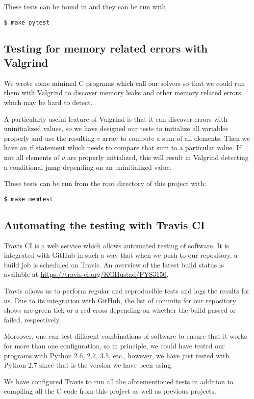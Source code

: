 These tests can be found in  and they can be run with

\begin{verbatim}
$ make pytest
\end{verbatim}


\subsection{Testing for memory related errors with Valgrind}
\label{appx:testing:valgrind}
We wrote some minimal C programs which call our solvers so that we could run them with Valgrind to discover memory leaks and other memory related errors which may be hard to detect.

A particularly useful feature of Valgrind is that it can discover errors with uninitialized values, so we have designed our tests to initialize all variables properly and use the resulting $v$ array to compute a sum of all elements. Then we have an if statement which needs to compare that sum to a particular value. If not all elements of $v$ are properly initialized, this will result in Valgrind detecting a conditional jump depending on an uninitialized value.

These tests can be run from the root directory of this project with:

\begin{verbatim}
$ make memtest
\end{verbatim}

\subsection{Automating the testing with Travis CI}
\label{appx:testing:travis}
Travis CI is a web service which allows automated testing of software. It is integrated with GitHub in such a way that when we push to our repository, a build job is scheduled on Travis. An overview of the latest build status is available at \url{https://travis-ci.org/KGHustad/FYS3150}.

Travis allows us to perform regular and reproducible tests and logs the results for us. Due to its integration with GitHub, the \href{https://github.com/KGHustad/FYS3150/commits/master}{list of commits for our repository} shows are green tick or a red cross depending on whether the build passed or failed, respectively.

Moreover, one can test different combinations of software to ensure that it works for more than one configuration, so in principle, we could have tested our programs with Python 2.6, 2.7, 3.5, etc., however, we have just tested with Python 2.7 since that is the version we have been using.

We have configured Travis to run all the aforementioned tests in addition to compiling all the C code from this project as well as previous projects.
